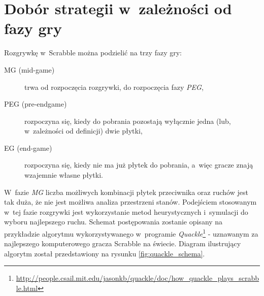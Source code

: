 \documentclass[a4paper,twocolumn,12pt]{article}
\begin{document}
\section*{Dobór strategii w~zależności od fazy gry}

Rozgrywkę w~Scrabble można podzielić na trzy fazy gry:

\begin{description}
 \item [MG (mid-game)] trwa od rozpoczęcia rozgrywki, do rozpoczęcia fazy \emph{PEG},
 \item [PEG (pre-endgame)] rozpoczyna się, kiedy do pobrania pozostają wyłącznie jedna (lub, w~zależności od definicji) dwie płytki,
 \item [EG (end-game)] rozpoczyna się, kiedy nie ma już płytek do pobrania, a~więc gracze znają wzajemnie własne płytki.
\end{description}

W~fazie \emph{MG} liczba możliwych kombinacji płytek przeciwnika oraz ruchów jest tak duża, że nie jest możliwa analiza przestrzeni stanów. Podejściem stosowanym w~tej fazie rozgrywki jest wykorzystanie metod heurystycznych i~symulacji do wyboru najlepszego ruchu. Schemat postępowania zostanie opisany na przykładzie algorytmu wykorzystywanego w~programie \emph{Quackle}\footnote{\url{http://people.csail.mit.edu/jasonkb/quackle/doc/how_quackle_plays_scrabble.html}} - uznawanym za najlepszego komputerowego gracza Scrabble na świecie. Diagram ilustrujący algorytm został przedstawiony na rysunku \ref{fig:quackle_schema}.
\end{document}
